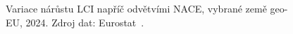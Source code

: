 \def\strProblemySektorDisperzeTitle{Variace nárůstu \acs{LCI} napříč odvětvími, vybrané země \acs{geo-EU} (2024)}%
\def\strProblemySektorDisperzeYlabel{variační koeficient nárůstu \acs{LCI} [\%]}%
\def\strProblemySektorDisperzeCaption{Variace nárůstu \acs{LCI} napříč odvětvími \acs{NACE}, vybrané země \acs{geo-EU}, 2024. Zdroj dat: Eurostat~\cite{eurostat_lci}.}%
%
\begin{figure}[H]
  \centering
  \resizebox{\linewidth}{!}{}
  \caption{\strProblemySektorDisperzeCaption}
  \label{fig:problemy_sektor_disperze}
\end{figure}
